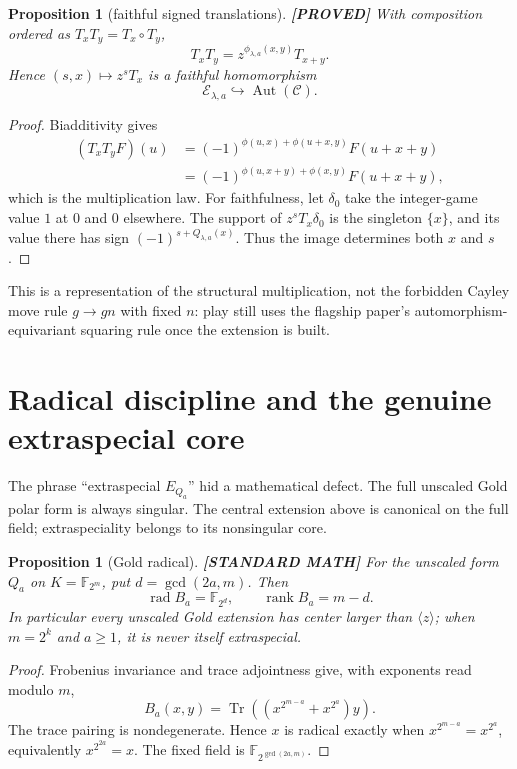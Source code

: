 \documentclass[11pt]{article}
\newtheorem{proposition}[theorem]{Proposition}
\theoremstyle{definition}
\theoremstyle{remark}
\newcommand{\F}{\mathbb{F}}
\newcommand{\Tr}{\operatorname{Tr}}
\newcommand{\Aut}{\operatorname{Aut}}
\newcommand{\taglabel}[1]{\textnormal{\textbf{[#1]}}}
\newcommand{\PROVED}{\taglabel{PROVED}}
\newcommand{\STANDARD}{\taglabel{STANDARD MATH}}
\begin{document}
\begin{proposition}[faithful signed translations]\label{prop:contexts}
\PROVED{}
With composition ordered as $T_xT_y=T_x\circ T_y$,
\[
 T_xT_y=z^{\phi_{\lambda,a}(x,y)}T_{x+y}.
\]
Hence $(s,x)\mapsto z^sT_x$ is a faithful homomorphism
\[
 \mathcal E_{\lambda,a}\hookrightarrow\Aut(\mathscr C).
\]
\end{proposition}

\begin{proof}
Biadditivity gives
\begin{align*}
 (T_xT_yF)(u)
 &=(-1)^{\phi(u,x)+\phi(u+x,y)}F(u+x+y)\\
 &=(-1)^{\phi(u,x+y)+\phi(x,y)}F(u+x+y),
\end{align*}
which is the multiplication law.  For faithfulness, let $\delta_0$ take
the integer-game value $1$ at $0$ and $0$ elsewhere.  The support of
$z^sT_x\delta_0$ is the singleton $\{x\}$, and its value there has sign
$(-1)^{s+Q_{\lambda,a}(x)}$.  Thus the image determines both $x$ and
$s$.
\end{proof}

This is a representation of the structural multiplication, not the
forbidden Cayley move rule $g\to gn$ with fixed $n$: play still uses the
flagship paper's automorphism-equivariant squaring rule once the extension
is built.

\section{Radical discipline and the genuine extraspecial core}

The phrase ``extraspecial $E_{Q_a}$'' hid a mathematical defect.  The
full unscaled Gold polar form is always singular.  The central extension
above is canonical on the full field; extraspeciality belongs to its
nonsingular core.

\begin{proposition}[Gold radical]\label{prop:radical}
\STANDARD{}
For the unscaled form $Q_a$ on $K=\F_{2^m}$, put
$d=\gcd(2a,m)$.  Then
\[
 \operatorname{rad}B_a=\F_{2^d},\qquad
 \operatorname{rank}B_a=m-d.
\]
In particular every unscaled Gold extension has center larger than
$\langle z\rangle$; when $m=2^k$ and $a\geq1$, it is never itself
extraspecial.
\end{proposition}

\begin{proof}
Frobenius invariance and trace adjointness give, with exponents read modulo
$m$,
\[
 B_a(x,y)=\Tr\!\left(
 (x^{2^{m-a}}+x^{2^a})y\right).
\]
The trace pairing is nondegenerate.  Hence $x$ is radical exactly when
$x^{2^{m-a}}=x^{2^a}$, equivalently $x^{2^{2a}}=x$.  The fixed field is
$\F_{2^{\gcd(2a,m)}}$.
\end{proof}
\end{document}
